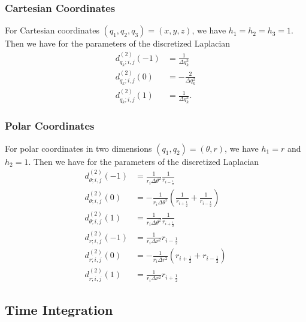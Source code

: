 \documentclass{article}
\numberwithin{equation}{section}
\begin{document}
\subsubsection{Cartesian Coordinates}

For Cartesian coordinates $(q_1,q_2,q_3) = (x,y,z)$, we have $h_1 = h_2 = h_3 = 1$.
Then we have for the parameters of the discretized Laplacian
\begin{equation}
    \begin{split}
        d^{(2)}_{q_k;i,j}(-1) &=  \frac{1}{\Delta q_k^2} \\
        d^{(2)}_{q_k;i,j}(0)  &= -\frac{2}{\Delta q_k^2} \\
        d^{(2)}_{q_k;i,j}(1)  &=  \frac{1}{\Delta q_k^2}.
    \end{split}
\end{equation}

\subsubsection{Polar Coordinates}

For polar coordinates in two dimensions $(q_1,q_2) = (\theta,r)$, we have $h_1 = r$ and $h_2 = 1$.
Then we have for the parameters of the discretized Laplacian
\begin{equation}
    \begin{split}
        d^{(2)}_{\theta;i,j}(-1) &= \frac{1}{r_i \Delta \theta^2} \frac{1}{r_{i-\tfrac12}} \\
        d^{(2)}_{\theta;i,j}(0)  &= -\frac{1}{r_i \Delta \theta^2} \left(
                \frac{1}{r_{i+\tfrac12}} +
                \frac{1}{r_{i-\tfrac12}}
            \right) \\
        d^{(2)}_{\theta;i,j}(1)  &= \frac{1}{r_i \Delta \theta^2} \frac{1}{r_{i+\tfrac12}} \\
        d^{(2)}_{r;i,j}(-1) &= \frac{1}{r_i \Delta r^2} r_{i-\tfrac12} \\
        d^{(2)}_{r;i,j}(0)  &= -\frac{1}{r_i \Delta r^2} \left(r_{i+\tfrac12} + r_{i-\tfrac12}\right) \\
        d^{(2)}_{r;i,j}(1)  &= \frac{1}{r_i \Delta r^2} r_{i+\tfrac12}
    \end{split}
\end{equation}

\subsection{Time Integration}
\end{document}
